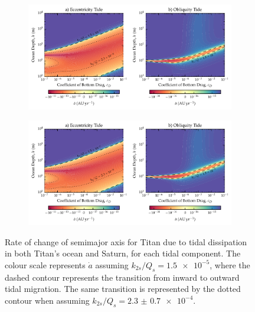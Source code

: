 \begin{figure}[!b]
    \centering
    \begin{subfigure}[t]{0.85\linewidth} %
        \includegraphics[width=\linewidth]{Figures/orbits_no_e2}
        \label{fig:a_evo_ecc}
    \end{subfigure}
    \begin{subfigure}[t]{0\linewidth} %
         \includegraphics[width=\linewidth]{Figures/orbits_no_e2}
         \label{fig:a_evo_obliq} 
    \end{subfigure}
    \vspace{-0.5cm}
\caption{Rate of change of semimajor axis for Titan due to tidal dissipation in both Titan's ocean and Saturn, for each tidal component. The colour scale represents $\dot{a}$ assuming $k_{2s}/Q_s = \num{1.5e-5}$, where the dashed contour represents the transition from inward to outward tidal migration. The same transition is represented by the dotted contour when assuming $k_{2s}/Q_s = \num[separate-uncertainty = true]{2.3(07)e-4}$.\label{fig:a_evo}}
\end{figure}

